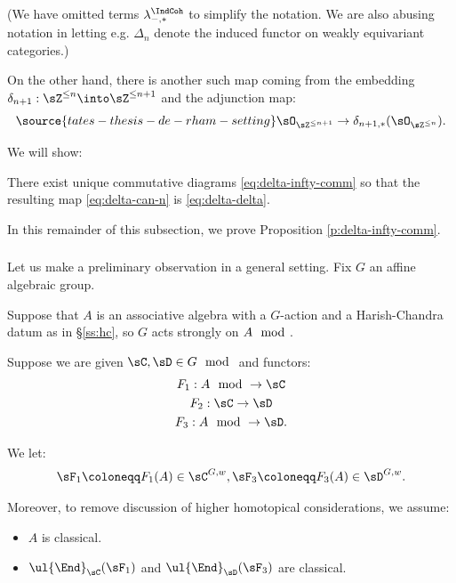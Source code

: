  (We have omitted terms $\lambda_{-,*}^{\IndCoh}$ to simplify
the notation. We are also abusing notation in letting
e.g. $\Delta_n$ denote the induced functor on
weakly equivariant categories.)

On the other hand, there is another such map coming from the embedding
$\delta_{n+1}:\sZ^{\leq n} \into \sZ^{\leq n+1}$ and the adjunction map:
%
\begin{equation}\label{eq:delta-delta}
\source{tates-thesis-de-rham-setting}
\sO_{\sZ^{\leq n+1}} \to \delta_{n+1,*}(\sO_{\sZ^{\leq n}}).
\end{equation}

We will show:

\begin{prop}
\notready\label{p:delta-infty-comm}

There exist unique commutative diagrams \eqref{eq:delta-infty-comm}
so that the resulting map \eqref{eq:delta-can-n} is \eqref{eq:delta-delta}.

\end{prop}

In this remainder of this subsection, we prove Proposition \ref{p:delta-infty-comm}.

\subsubsection{}\label{sss:hc-comm-diags}

Let us make a preliminary observation in a general setting. Fix $G$
an affine algebraic group.

Suppose that $A$ is an associative algebra with a
$G$-action and a Harish-Chandra datum as in \S \ref{ss:hc}, so
$G$ acts strongly on $A\mod$.

Suppose we are given $\sC,\sD \in G\mod$ and functors:
%
\[
\begin{gathered}
F_1:A\mod \to \sC \\
F_2:\sC \to \sD \\
F_3:A \mod \to \sD.
\end{gathered}
\]

We let:
%
\[
\sF_1 \coloneqq F_1(A) \in \sC^{G,w}, \sF_3 \coloneqq F_3(A) \in \sD^{G,w}.
\]

Moreover, to remove discussion of higher homotopical considerations,
we assume:

\begin{itemize}

\item $A$ is classical.

\item $\ul{\End}_{\sC}(\sF_1)$ and $\ul{\End}_{\sD}(\sF_3)$ are classical.

\end{itemize}

